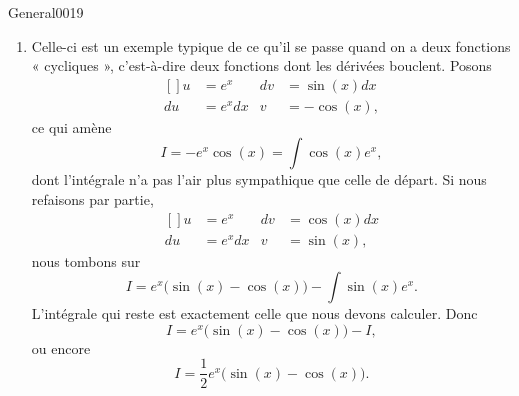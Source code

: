 \begin{corrige}{General0019}
\begin{enumerate}
\item
Celle-ci est un exemple typique de ce qu'il se passe quand on a deux fonctions « cycliques », c'est-à-dire deux fonctions dont les dérivées bouclent. Posons
\begin{equation}
	\begin{aligned}[]
		u&=e^x		&	dv&=\sin(x)dx\\
		du&=e^xdx	&	v&=-\cos(x),
	\end{aligned}
\end{equation}
ce qui amène
\begin{equation}
	I=-e^x\cos(x)=\int\cos(x)e^x,
\end{equation}
dont l'intégrale n'a pas l'air plus sympathique que celle de départ. Si nous refaisons par partie,
\begin{equation}
	\begin{aligned}[]
		u&=e^x		&	dv&=\cos(x)dx\\
		du&=e^xdx	&	v&=\sin(x),
	\end{aligned}
\end{equation}
nous tombons sur
\begin{equation}
	I=e^x\big( \sin(x)-\cos(x) \big)-\int\sin(x)e^x.
\end{equation}
L'intégrale qui reste est exactement celle que nous devons calculer. Donc
\begin{equation}
	I=e^x\big( \sin(x)-\cos(x) \big)-I,
\end{equation}
ou encore
\begin{equation}
	I=\frac{1}{ 2 }e^x\big( \sin(x)-\cos(x) \big).
\end{equation}

\end{enumerate}


\end{corrige}
